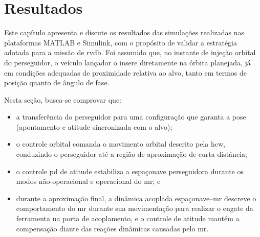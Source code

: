 \chapter{Resultados}
\label{sec_resultados}

Este capítulo apresenta e discute os resultados das simulações realizadas nas plataformas MATLAB e Simulink, com o propósito de validar a estratégia adotada para a missão de \gls{rvdb}.
Foi assumido que, no instante de injeção orbital do perseguidor, o veículo lançador o insere diretamente na órbita planejada, já em condições adequadas de proximidade relativa ao alvo, tanto em termos de posição quanto de ângulo de fase.


Nesta seção, busca-se comprovar que:
\begin{itemize}
  \item a transferência do perseguidor para uma configuração que garanta a pose (apontamento e atitude sincronizada com o alvo);
  \item o controle orbital comanda o movimento orbital descrito pela \gls{hcw}, conduzindo o perseguidor até a região de aproximação de curta distância;
  \item o controle \gls{pd} de atitude estabiliza a espaçonave perseguidora durante os modos não-operacional e operacional do \gls{mr}; e
  \item durante a aproximação final, a dinâmica acoplada espaçonave--\gls{mr} descreve o comportamento do \gls{mr} durante sua movimentação para realizar o engate da ferramenta na porta de acoplamento, e o controle de atitude mantém a compensação diante das reações dinâmicas causadas pelo \gls{mr}.
\end{itemize}

% 

% 

% 

% 
